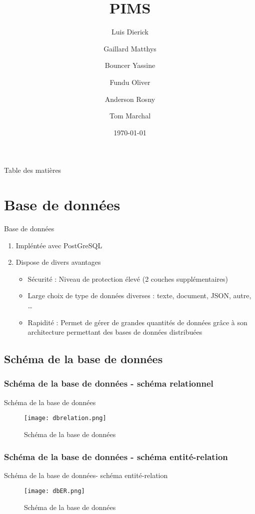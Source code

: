 \documentclass[numbering=fraction]{beamer}
\title{PIMS}
\author[PIMS]{Luis Dierick \and Gaillard Matthys \and Bouncer Yassine \and Fundu Oliver \and Anderson Rosny \and Tom Marchal }
\institute{Université de Namur}
\date{\today}
\begin{document}
\begin{frame}[plain]{}
    \maketitle
\end{frame}

\begin{frame}{Table des matières}
    \tableofcontents[]
\end{frame}

\section{Base de données}
\begin{frame}{Base de données}
    \begin{enumerate}
        \item Impléntée avec PostGreSQL
        \item Dispose de divers avantages
        \begin{itemize}
            \item Sécurité : Niveau de protection élevé (2 couches supplémentaires)
            \item Large choix de type de données diverses : texte, document, JSON, autre, \dots
            \item Rapidité : Permet de gérer de grandes quantités de données grâce à son architecture permettant des bases de données distribuées
        \end{itemize}
    \end{enumerate}
\end{frame}
\subsection{Schéma de la base de données}
\subsubsection{Schéma de la base de données - schéma relationnel}
\begin{frame}{Schéma de la base de données}
    \begin{figure}
        \centering
        \texttt{[image: dbrelation.png]}
        \caption{Schéma de la base de données}
    \end{figure}
\end{frame}
\subsubsection{Schéma de la base de données - schéma entité-relation}
\begin{frame}{Schéma de la base de données- schéma entité-relation}
    \begin{figure}
        \centering
        \texttt{[image: dbER.png]}
        \caption{Schéma de la base de données}
    \end{figure}
\end{frame}
\end{document}
